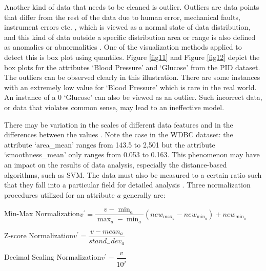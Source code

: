 
Another kind of data that needs to be cleaned is outlier. Outliers are data points that differ from the rest of the data due to human error, mechanical faults, instrument errors etc. \cite{89}, which is viewed as a normal state of data distribution, and this kind of data outside a specific distribution area or range is also defined as anomalies or abnormalities \cite{88}. One of the visualization methods applied to detect this is box plot using quantiles. Figure \ref{fig11} and Figure \ref{fig12} depict the box plots for the attributes `Blood Pressure' and `Glucose' from the PID dataset. The outliers can be observed clearly in this illustration. There are some instances with an extremely low value for `Blood Pressure' which is rare in the real world. An instance of a 0 `Glucose' can also be viewed as an outlier. Such incorrect data, or data that violates common sense, may lead to an ineffective model. 


There may be variation in the scales of different data features and in the differences between the values \cite{85}. Note the case in the WDBC dataset: the attribute `area\_mean' ranges from 143.5 to 2,501 but the attribute `smoothness\_mean' only ranges from 0.053 to 0.163. This phenomenon may have an impact on the results of data analysis, especially the distance-based algorithms, such as SVM. The data must also be measured to a certain ratio such that they fall into a particular field for detailed analysis \cite{77}. Three normalization procedures \cite{77,78,85} utilized for an attribute $a$ generally are:

Min-Max Normalization\footnotemark[14]\hspace{50pt}$v^{\prime}=\dfrac{v-\min _{a}}{\max _{a}-\min _{a}}\left(n e w_{\max _{a}}-n e w_{\min _{a}}\right)+n e w_{\min _{a}}$

Z-score Normalization\footnotemark[15]\hspace{150pt}$v^{\prime}=\dfrac{v-m e a n_{a}}{s t a n d_{-} d e v_{a}}$

Decimal Scaling Normalization\footnotemark[16]\hspace{130pt}$v^{\prime}=\dfrac{v}{10^{j}}$

